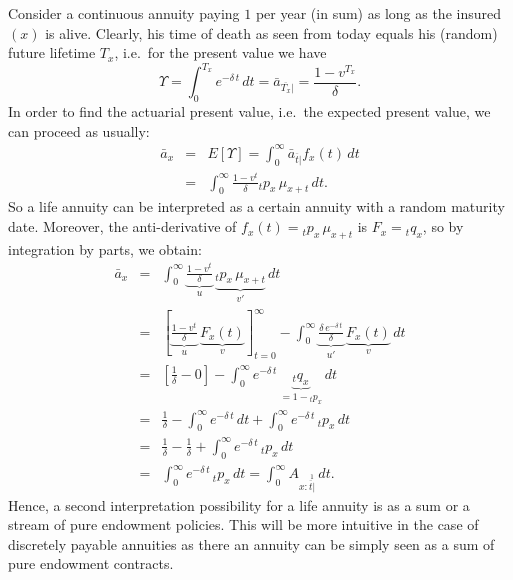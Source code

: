 \documentclass[11pt,fleqn,oneside]{book}
\begin{document}
Consider a continuous annuity paying $1$ per year (in sum) as long as the insured $(x)$ is alive. Clearly, his time of death as seen from today equals his (random) future lifetime $T_x$, i.e.\ for the present value we have
$$
\Upsilon = \int_0^{T_x} e^{-\delta\,t}\,dt = {\bar{a}_{\overline{T_x}|}} = \frac{1-v^{T_x}}{\delta}.
$$
In order to find the actuarial present value, i.e.\ the expected present value, we can proceed as usually:
\begin{eqnarray*}
\bar{a}_{x} &=& E[\Upsilon] = \int_0^\infty  \bar{a}_{\overline{t}|} f_x(t)\,dt\\
&=& \int_0^{\infty} \frac{1 - v^t}{\delta} {_tp_x}\,{\mu_{x+t}}\,dt.
\end{eqnarray*}
So a life annuity can be interpreted as a certain annuity with a random maturity date. Moreover,
the anti-derivative of $f_x(t)={_tp_x}\,\mu_{x+t}$ is $F_x={_tq_x}$, so by integration by parts, we obtain:
\begin{eqnarray}
\bar{a}_{x} &=&   \int_0^{\infty} \underbrace{\frac{1 - v^t}{\delta}}_{u}\, \underbrace{{_tp_x}\,{\mu_{x+t}}}_{v'}\,dt \nonumber \\
&=&  \left[ \underbrace{\frac{1 - v^t}{\delta}}_{u}  \,\underbrace{F_x(t)}_{v}\right]_{t=0}^{\infty} -  \int_0^{\infty} \underbrace{\frac{\delta \, e^{-\delta\,t}}{\delta}}_{u'}\, \underbrace{F_x(t)}_{v}\,dt \nonumber \\
&=& \left[\frac{1}{\delta} - 0 \right] - \int_0^{\infty} e^{-\delta\,t}\,\underbrace{_tq_x}_{=1-{_tp_x}}\,dt\nonumber \\
&=& \frac{1}{\delta} - \int_0^{\infty} e^{-\delta\,t}\,dt + \int_0^{\infty}e^{-\delta\, t}\,{_tp_x}\,dt \nonumber \\
&=& \frac{1}{\delta} - \frac{1}{\delta} + \int_0^{\infty}e^{-\delta\, t}\,{_tp_x}\,dt \nonumber \\
&=& \int_0^{\infty}e^{-\delta\, t}\,{_tp_x}\,dt = \int_0^{\infty} {A_{x:\stackrel{1}{\overline{t}|}}}\,dt.  \label{EQLIFEANNINT}
\end{eqnarray}
Hence, a second interpretation possibility for a life annuity is as a sum or a stream of pure endowment policies. This will be more intuitive in the case of discretely payable annuities as there an annuity can be simply seen as a sum of pure endowment contracts.
\end{document}
